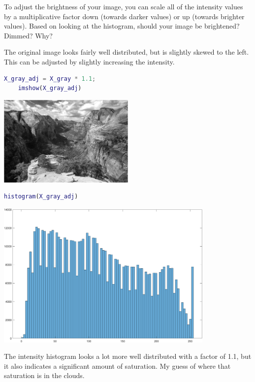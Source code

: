 To adjust the brightness of your image, you can scale all of the intensity values by a multiplicative factor down (towards darker values) or up (towards brighter values). Based on looking at the histogram, should your image be brightened? Dimmed? Why?

\begin{solution}
    The original image looks fairly well distributed, but is slightly skewed to the left. This can be adjusted by slightly increasing the intensity.
    
    \begin{lstlisting}[language=Matlab]
    X_gray_adj = X_gray * 1.1;
    imshow(X_gray_adj)
    \end{lstlisting}
    
    \begin{center}
        \includegraphics[width=0.5\textwidth]{img/e7p6_img.png}
    \end{center}
    
    \begin{lstlisting}[language=Matlab]
    histogram(X_gray_adj)
    \end{lstlisting}
    
    \begin{center}
        \includegraphics[width=0.8\textwidth]{img/e7p6_hist.png}
    \end{center}
    
    The intensity histogram looks a lot more well distributed with a factor of 1.1, but it also indicates a significant amount of saturation. My guess of where that saturation is in the clouds.
\end{solution}
